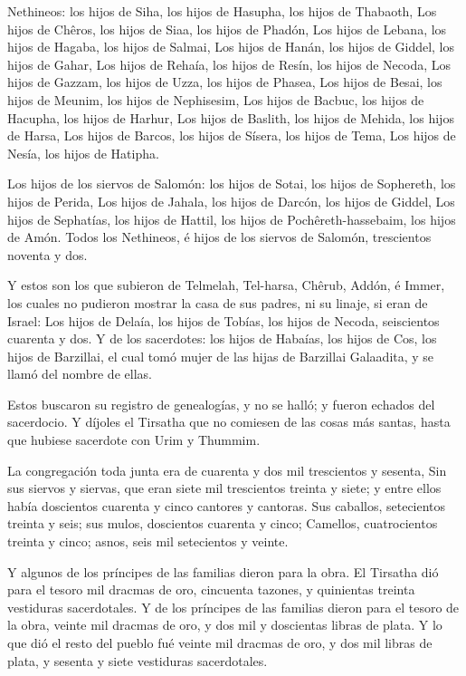  Nethineos: los hijos de Siha, los hijos de Hasupha, los
hijos de Thabaoth,  Los hijos de Chêros, los hijos de Siaa,
los hijos de Phadón,  Los hijos de Lebana, los hijos de
Hagaba, los hijos de Salmai,  Los hijos de Hanán, los hijos
de Giddel, los hijos de Gahar,  Los hijos de Rehaía, los
hijos de Resín, los hijos de Necoda,  Los hijos de Gazzam,
los hijos de Uzza, los hijos de Phasea,  Los hijos de
Besai, los hijos de Meunim, los hijos de Nephisesim,  Los
hijos de Bacbuc, los hijos de Hacupha, los hijos de Harhur,
 Los hijos de Baslith, los hijos de Mehida, los hijos de
Harsa,  Los hijos de Barcos, los hijos de Sísera, los hijos
de Tema,  Los hijos de Nesía, los hijos de Hatipha.

 Los hijos de los siervos de Salomón: los hijos de Sotai,
los hijos de Sophereth, los hijos de Perida,  Los hijos de
Jahala, los hijos de Darcón, los hijos de Giddel,  Los
hijos de Sephatías, los hijos de Hattil, los hijos de
Pochêreth-hassebaim, los hijos de Amón.  Todos los
Nethineos, é hijos de los siervos de Salomón, trescientos noventa y dos.

 Y estos son los que subieron de Telmelah, Tel-harsa,
Chêrub, Addón, é Immer, los cuales no pudieron mostrar la casa de sus
padres, ni su linaje, si eran de Israel:  Los hijos de
Delaía, los hijos de Tobías, los hijos de Necoda, seiscientos cuarenta y
dos.  Y de los sacerdotes: los hijos de Habaías, los hijos
de Cos, los hijos de Barzillai, el cual tomó mujer de las hijas de
Barzillai Galaadita, y se llamó del nombre de ellas.

 Estos buscaron su registro de genealogías, y no se halló;
y fueron echados del sacerdocio.  Y díjoles el Tirsatha que
no comiesen de las cosas más santas, hasta que hubiese sacerdote con
Urim y Thummim.

 La congregación toda junta era de cuarenta y dos mil
trescientos y sesenta,  Sin sus siervos y siervas, que eran
siete mil trescientos treinta y siete; y entre ellos había doscientos
cuarenta y cinco cantores y cantoras.  Sus caballos,
setecientos treinta y seis; sus mulos, doscientos cuarenta y cinco;
 Camellos, cuatrocientos treinta y cinco; asnos, seis mil
setecientos y veinte.

 Y algunos de los príncipes de las familias dieron para la
obra. El Tirsatha dió para el tesoro mil dracmas de oro, cincuenta
tazones, y quinientas treinta vestiduras sacerdotales.  Y
de los príncipes de las familias dieron para el tesoro de la obra,
veinte mil dracmas de oro, y dos mil y doscientas libras de plata.
 Y lo que dió el resto del pueblo fué veinte mil dracmas de
oro, y dos mil libras de plata, y sesenta y siete vestiduras
sacerdotales.

